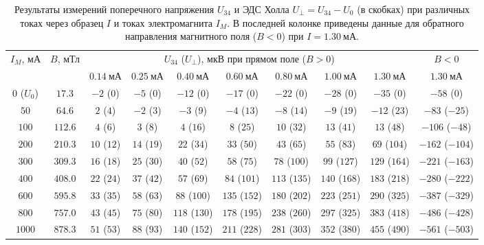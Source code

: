 \documentclass[reprint, amsmath, amssymb, aps, pra, nofootinbib]{revtex4-2}
\begin{document}
\begin{table}[t!]
\caption{Результаты измерений поперечного напряжения $U_{34}$ и ЭДС Холла $U_\perp = U_{34} - U_0$ (в скобках) при различных токах через образец $I$ и токах электромагнита $I_M$. В последней колонке приведены данные для обратного направления магнитного поля ($B < 0$) при $I = 1.30~\text{мА}$.}
\label{tab:raw_data}
\begin{ruledtabular}
\begin{tabular}{cccccccccc}
$I_M$, мА & $B$, мТл & \multicolumn{7}{c}{$U_{34}$ ($U_\perp$), мкВ при прямом поле ($B > 0$)} & $B < 0$ \\
\cline{3-9}
 & & $0.14~\text{мА}$ & $0.25~\text{мА}$ & $0.40~\text{мА}$ & $0.60~\text{мА}$ & $0.80~\text{мА}$ & $1.00~\text{мА}$ & $1.30~\text{мА}$ & $1.30~\text{мА}$ \\
\hline
$0$ ($U_0$) & $17.3$ & $-2$ ($0$) & $-5$ ($0$) & $-12$ ($0$) & $-17$ ($0$) & $-22$ ($0$) & $-28$ ($0$) & $-35$ ($0$) & $-58$ ($0$) \\
$50$ & $64.6$ & $2$ ($4$) & $-2$ ($3$) & $-3$ ($9$) & $-4$ ($13$) & $-8$ ($14$) & $-9$ ($19$) & $-12$ ($23$) & $-83$ ($-25$) \\
$100$ & $112.6$ & $4$ ($6$) & $3$ ($8$) & $4$ ($16$) & $8$ ($25$) & $10$ ($32$) & $13$ ($41$) & $13$ ($48$) & $-106$ ($-48$) \\
$200$ & $210.3$ & $10$ ($12$) & $14$ ($19$) & $22$ ($34$) & $33$ ($50$) & $43$ ($65$) & $55$ ($83$) & $69$ ($104$) & $-162$ ($-104$) \\
$300$ & $309.3$ & $16$ ($18$) & $25$ ($30$) & $40$ ($52$) & $58$ ($75$) & $78$ ($100$) & $99$ ($127$) & $129$ ($164$) & $-221$ ($-163$) \\
$400$ & $408.0$ & $22$ ($24$) & $37$ ($42$) & $57$ ($69$) & $84$ ($101$) & $113$ ($135$) & $140$ ($168$) & $183$ ($218$) & $-280$ ($-222$) \\
$600$ & $595.8$ & $33$ ($35$) & $58$ ($63$) & $88$ ($100$) & $135$ ($152$) & $180$ ($202$) & $223$ ($251$) & $290$ ($325$) & $-387$ ($-329$) \\
$800$ & $757.0$ & $43$ ($45$) & $75$ ($80$) & $118$ ($130$) & $178$ ($195$) & $238$ ($260$) & $297$ ($325$) & $383$ ($418$) & $-486$ ($-428$) \\
$1000$ & $878.3$ & $51$ ($53$) & $88$ ($93$) & $140$ ($152$) & $211$ ($228$) & $281$ ($303$) & $352$ ($380$) & $455$ ($490$) & $-561$ ($-503$) \\
\end{tabular}
\end{ruledtabular}
\end{table} 
\end{document}
